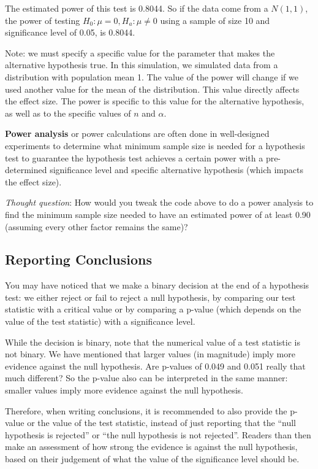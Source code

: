 \documentclass[
]{book}
\begin{document}
The estimated power of this test is 0.8044. So if the data come from a \(N(1,1)\), the power of testing \(H_0: \mu = 0, H_a: \mu \neq 0\) using a sample of size 10 and significance level of 0.05, is 0.8044.

Note: we must specify a specific value for the parameter that makes the alternative hypothesis true. In this simulation, we simulated data from a distribution with population mean 1. The value of the power will change if we used another value for the mean of the distribution. This value directly affects the effect size. The power is specific to this value for the alternative hypothesis, as well as to the specific values of \(n\) and \(\alpha\).

\textbf{Power analysis} or power calculations are often done in well-designed experiments to determine what minimum sample size is needed for a hypothesis test to guarantee the hypothesis test achieves a certain power with a pre-determined significance level and specific alternative hypothesis (which impacts the effect size).

\emph{Thought question}: How would you tweak the code above to do a power analysis to find the minimum sample size needed to have an estimated power of at least 0.90 (assuming every other factor remains the same)?

\hypertarget{reporting-conclusions}{%
\subsection{Reporting Conclusions}\label{reporting-conclusions}}

You may have noticed that we make a binary decision at the end of a hypothesis test: we either reject or fail to reject a null hypothesis, by comparing our test statistic with a critical value or by comparing a p-value (which depends on the value of the test statistic) with a significance level.

While the decision is binary, note that the numerical value of a test statistic is not binary. We have mentioned that larger values (in magnitude) imply more evidence against the null hypothesis. Are p-values of 0.049 and 0.051 really that much different? So the p-value also can be interpreted in the same manner: smaller values imply more evidence against the null hypothesis.

Therefore, when writing conclusions, it is recommended to also provide the p-value or the value of the test statistic, instead of just reporting that the ``null hypothesis is rejected'' or ``the null hypothesis is not rejected''. Readers than then make an assessment of how strong the evidence is against the null hypothesis, based on their judgement of what the value of the significance level should be.
\end{document}
